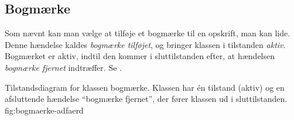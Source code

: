 \subsection{Bogmærke}
Som nævnt kan man vælge at tilføje et bogmærke til en opskrift, man kan lide. Denne hændelse kaldes \textit{bogmærke tilføjet}, og bringer klassen i tilstanden \textit{aktiv}. Bogmærket er aktiv, indtil den kommer i sluttilstanden efter, at hændelsen \textit{bogmærke fjernet} indtræffer. Se .

  {Tilstandsdiagram for klassen bogmærke. Klassen har én tilstand (aktiv) og en afsluttende hændelse ``bogmærke fjernet'', der fører klassen ud i sluttilstanden.}
  {fig:bogmaerke-adfaerd}
